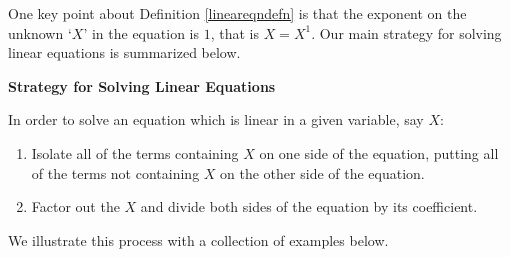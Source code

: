 \documentclass[11pt]{article}
\theoremstyle{definition}  %
\newcommand{\bbm}{\begin{boxedminipage}{6.41in}}
\newcommand{\ebm}{\end{boxedminipage}}
\begin{document}
One key point about Definition \ref{lineareqndefn} is that the exponent on the unknown `$X$' in the equation is $1$, that is $X = X^1$. Our main strategy for solving linear equations is summarized below.

\medskip

 \label{strategyforsolvinglineareqns}

\colorbox{ResultColor}{\bbm

\centerline{\textbf{Strategy for Solving Linear Equations}}

\vspace{0.05in}

In order to solve an equation which is linear in a given variable, say $X$:

\vspace{-0.1in}

\begin{enumerate}

\item  Isolate all of the terms containing $X$ on one side of the equation, putting all of the terms not containing $X$ on the other side of the equation.

\item  Factor out the $X$ and divide both sides of the equation by its coefficient.

\end{enumerate}

\ebm}

\medskip

We illustrate this process with a collection of examples below.
\end{document}
